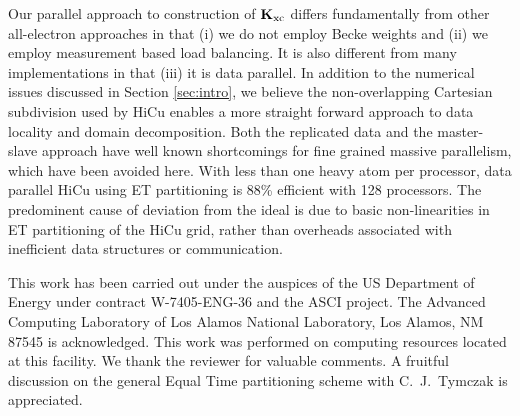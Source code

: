\commentoutA{\documentclass[prl,aps,twocolumn,showpacs,twocolumngrid,superbib]{revtex4}}
\newcommand{\Kxc}{{\bf K}_{\mathrm{xc}}}
\begin{document}
Our parallel approach to construction of $\Kxc$ differs fundamentally
from other all-electron approaches in that (i) we do not employ Becke
weights and (ii) we employ measurement based load balancing.  It is
also different from many implementations in that (iii) it is data
parallel.  In addition to the numerical issues discussed in Section
\ref{sec:intro}, we believe the non-overlapping Cartesian subdivision
used by HiCu enables a more straight forward approach to data locality
and domain decomposition.  Both the replicated data and the
master-slave approach have well known shortcomings for fine grained
massive parallelism, which have been avoided here.  With less than one
heavy atom per processor, data parallel HiCu using ET partitioning is
88\% efficient with 128 processors.  The predominent cause of
deviation from the ideal is due to basic non-linearities in ET
partitioning of the HiCu grid, rather than overheads associated with
inefficient data structures or communication.

\begin{acknowledgments}
This work has been carried out under the auspices of the US Department
of Energy under contract W-7405-ENG-36 and the ASCI project.  The
Advanced Computing Laboratory of Los Alamos National Laboratory, Los
Alamos, NM 87545 is acknowledged.  This work was performed on
computing resources located at this facility.
We thank the reviewer for valuable comments. A fruitful 
discussion on the general
Equal Time partitioning scheme with C.~J.~Tymczak is appreciated.
\end{acknowledgments}


 

\pagebreak
\end{document}
